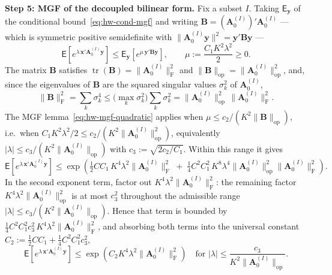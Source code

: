\documentclass[12pt,a4paper]{article}
\makeatletter
\theoremstyle{definition}
\renewenvironment{proof}[1][\proofname]{\par
  \pushQED{\qed}%
  \normalfont \topsep6\p@\@plus6\p@\relax
  \trivlist
  \item[\hskip\labelsep\bfseries #1\@addpunct{.}]\ignorespaces
}{%
  \popQED\endtrivlist\@endpefalse
}
\newcommand\expc{\mathsf{E}}
\DeclareMathOperator\tr{tr}
\newcommand{\by}{\mathbf{y}}
\newcommand{\bx}{\mathbf{x}}
\newcommand{\bA}{\mathbf{A}}
\newcommand{\bB}{\mathbf{B}}
\newcommand{\opnorm}[1]{\|#1\|_{\mathrm{op}}}
\newcommand{\fnorm}[1]{\|#1\|_{\mathrm{F}}}
\makeatother
\begin{document}
\begin{proof}
\textbf{Step 5: MGF of the decoupled bilinear form.} Fix a subset $I$. Taking $\expc_\by$ of the conditional bound~\eqref{eq:hw-cond-mgf} and writing $\bB = (\bA_0^{(I)})'\bA_0^{(I)}$ --- which is symmetric positive semidefinite with $\|\bA_0^{(I)}\by\|^2 = \by'\bB\by$ ---
\[
\expc\!\left[e^{\lambda\,\bx'\bA_0^{(I)}\by}\right] \leqslant \expc_\by\!\left[e^{\mu\,\by'\bB\by}\right], \qquad \mu := \frac{C_1 K^2\lambda^2}{2} \geqslant 0.
\]
The matrix $\bB$ satisfies $\tr(\bB) = \fnorm{\bA_0^{(I)}}^2$ and $\opnorm{\bB} = \opnorm{\bA_0^{(I)}}^2$, and, since the eigenvalues of $\bB$ are the squared singular values $\sigma_k^2$ of $\bA_0^{(I)}$,
\[
\fnorm{\bB}^2 = \sum_k \sigma_k^4 \leqslant \Big(\max_k \sigma_k^2\Big)\sum_k \sigma_k^2 = \opnorm{\bA_0^{(I)}}^2\,\fnorm{\bA_0^{(I)}}^2.
\]
The MGF lemma~\eqref{eq:hw-mgf-quadratic} applies when $\mu \leqslant c_2/(K^2\opnorm{\bB})$, i.e.\ when $C_1 K^2\lambda^2/2 \leqslant c_2/(K^2\opnorm{\bA_0^{(I)}}^2)$, equivalently $|\lambda| \leqslant c_3/(K^2\opnorm{\bA_0^{(I)}})$ with $c_3 := \sqrt{2c_2/C_1}$. Within this range it gives
\[
\expc\!\left[e^{\lambda\,\bx'\bA_0^{(I)}\by}\right] \leqslant \exp\!\left(\tfrac{1}{2}C C_1\, K^4\lambda^2\fnorm{\bA_0^{(I)}}^2 \;+\; \tfrac{1}{4}C^2 C_1^2\, K^8\lambda^4\opnorm{\bA_0^{(I)}}^2\fnorm{\bA_0^{(I)}}^2\right).
\]
In the second exponent term, factor out $K^4\lambda^2\fnorm{\bA_0^{(I)}}^2$: the remaining factor $K^4\lambda^2\opnorm{\bA_0^{(I)}}^2$ is at most $c_3^2$ throughout the admissible range $|\lambda| \leqslant c_3/(K^2\opnorm{\bA_0^{(I)}})$. Hence that term is bounded by $\tfrac{1}{4}C^2 C_1^2 c_3^2\, K^4\lambda^2\fnorm{\bA_0^{(I)}}^2$, and absorbing both terms into the universal constant $C_2 := \tfrac{1}{2}C C_1 + \tfrac{1}{4}C^2 C_1^2 c_3^2$,
\begin{equation}\label{eq:hw-bilinear-mgf}
\expc\!\left[e^{\lambda\,\bx'\bA_0^{(I)}\by}\right] \leqslant \exp\!\left(C_2 K^4\lambda^2\fnorm{\bA_0^{(I)}}^2\right) \quad \text{for } |\lambda| \leqslant \frac{c_3}{K^2\opnorm{\bA_0^{(I)}}}.
\end{equation}


\end{proof}
\end{document}
